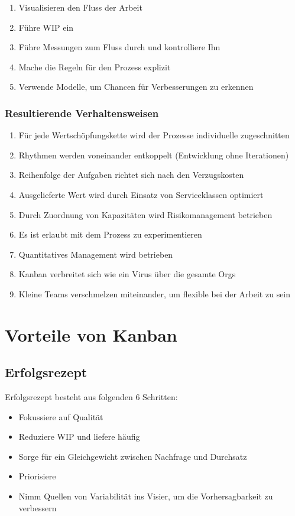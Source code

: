 
\begin{enumerate}
  \item Visualisieren den Fluss der Arbeit
  \item Führe WIP ein
  \item Führe Messungen zum Fluss durch und kontrolliere Ihn
  \item Mache die Regeln für den Prozess explizit
  \item Verwende Modelle, um Chancen für Verbesserungen zu erkennen
\end{enumerate}


\subsubsection{Resultierende Verhaltensweisen}
\begin{enumerate}
  \item Für jede Wertschöpfungskette wird der Prozesse individuelle zugeschnitten
  \item Rhythmen werden voneinander entkoppelt (Entwicklung ohne Iterationen)
  \item Reihenfolge der Aufgaben richtet sich nach den Verzugskosten
  \item Ausgelieferte Wert wird durch Einsatz von Serviceklassen optimiert
  \item Durch Zuordnung von Kapazitäten wird Risikomanagement betrieben
  \item Es ist erlaubt mit dem Prozess zu experimentieren
  \item Quantitatives Management wird betrieben
  \item Kanban verbreitet sich wie ein Virus über die gesamte Orgs
  \item Kleine Teams verschmelzen miteinander, um flexible bei der Arbeit zu sein
\end{enumerate}


\section{Vorteile von Kanban}

\subsection{Erfolgsrezept}
Erfolgsrezept besteht aus folgenden 6 Schritten:

\begin{itemize}
  \item Fokussiere auf Qualität
  \item Reduziere WIP und liefere häufig
  \item Sorge für ein Gleichgewicht zwischen Nachfrage und Durchsatz
  \item Priorisiere
  \item Nimm Quellen von Variabilität ins Visier, um die Vorhersagbarkeit zu verbessern
\end{itemize}


